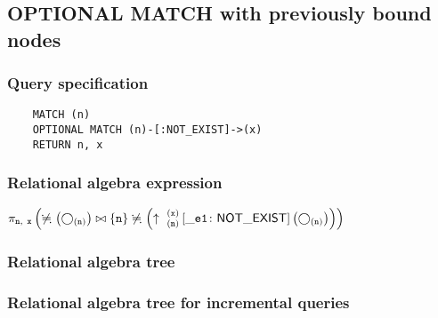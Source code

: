 	\subsection{OPTIONAL MATCH with previously bound nodes}

	\subsubsection*{Query specification}

	\begin{lstlisting}
	MATCH (n)
	OPTIONAL MATCH (n)-[:NOT_EXIST]->(x)
	RETURN n, x
	\end{lstlisting}


	\subsubsection*{Relational algebra expression}

	$\projection{\var{n},~\var{x}} \left(\alldifferent{} \left(\getvertices{n}{}\right) \join \{\var{n}\} \alldifferent{} \left(\expandout{n}{x}{}{\_e1}{NOT\_EXIST} \left(\getvertices{n}{}\right)\right)\right)$

	\subsubsection*{Relational algebra tree}


	\subsubsection*{Relational algebra tree for incremental queries}

